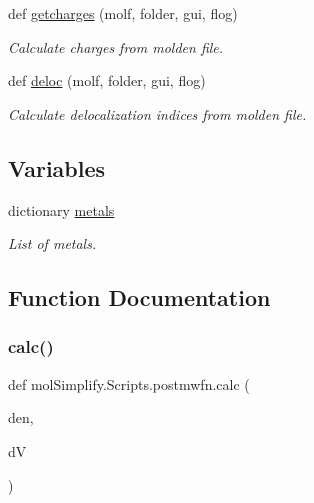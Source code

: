 \begin{DoxyCompactItemize}
def \hyperlink{namespacemolSimplify_1_1Scripts_1_1postmwfn_a01480945515714deee75f164f07a8b6f}{getcharges} (molf, folder, gui, flog)
\begin{DoxyCompactList}\small\item\em Calculate charges from molden file. \end{DoxyCompactList}\item 
def \hyperlink{namespacemolSimplify_1_1Scripts_1_1postmwfn_a3d06d34a3a564ff309a955f7a30a1f96}{deloc} (molf, folder, gui, flog)
\begin{DoxyCompactList}\small\item\em Calculate delocalization indices from molden file. \end{DoxyCompactList}\end{DoxyCompactItemize}
\subsection*{Variables}
\begin{DoxyCompactItemize}
\item 
dictionary \hyperlink{namespacemolSimplify_1_1Scripts_1_1postmwfn_a9a96407d6ceb115d681da0f03f378b61}{metals}
\begin{DoxyCompactList}\small\item\em List of metals. \end{DoxyCompactList}\end{DoxyCompactItemize}


\subsection{Function Documentation}
\mbox{\label{namespacemolSimplify_1_1Scripts_1_1postmwfn_a2c5438051e9d06efd355d34eb5966673}} 
\subsubsection{\texorpdfstring{calc()}{calc()}}
{\footnotesize\ttfamily def mol\+Simplify.\+Scripts.\+postmwfn.\+calc (\begin{DoxyParamCaption}\item[{}]{den,  }\item[{}]{dV }\end{DoxyParamCaption})}



